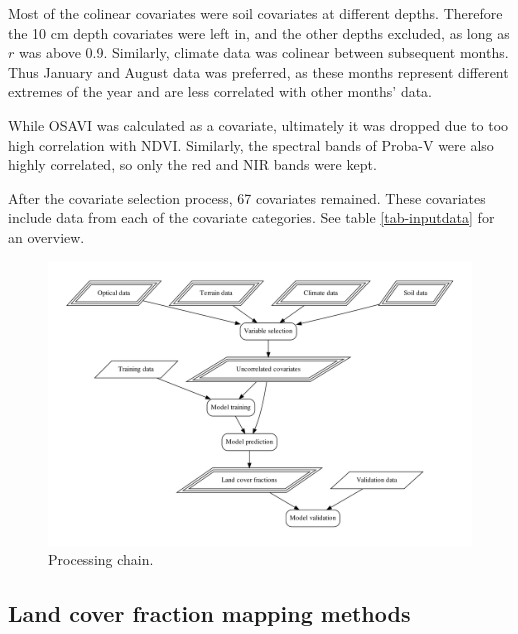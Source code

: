 \documentclass[a4paper,10pt]{article}
\begin{document}
Most of the colinear covariates were soil covariates at different depths.
Therefore the 10 cm depth covariates were left in, and the other depths excluded, as long as $r$ was above 0.9.
Similarly, climate data was colinear between subsequent months. Thus January and August data was preferred, as these months represent different extremes of the year and are less correlated with other months' data.

While \ac{OSAVI} was calculated as a covariate, ultimately it was dropped due to too high correlation with \ac{NDVI}.
Similarly, the spectral bands of Proba-V were also highly correlated, so only the red and \ac{NIR} bands were kept.

After the covariate selection process, 67 covariates remained.
These covariates include data from each of the covariate categories.
See table \ref{tab-inputdata} for an overview.


\begin{figure}
 \includegraphics[width=\textwidth]{article-figures/flowcharts/processing}
 \caption{Processing chain.}
 \label{fig-processing}
\end{figure}

\subsection{Land cover fraction mapping methods}
\end{document}
